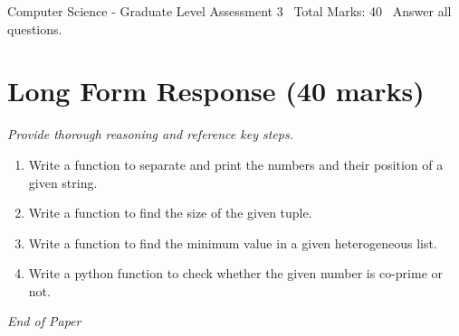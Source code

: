 \documentclass[12pt]{article}
\begin{document}
\begin{center}
Computer Science - Graduate Level Assessment 3 \
Total Marks: 40 \
Answer all questions.
\end{center}

\section*{Long Form Response (40 marks)}
\textit{Provide thorough reasoning and reference key steps.}
\begin{enumerate}[label=\arabic*.]
\item Write a function to separate and print the numbers and their position of a given string.
\item Write a function to find the size of the given tuple.
\item Write a function to find the minimum value in a given heterogeneous list.
\item Write a python function to check whether the given number is co-prime or not.
\end{enumerate}

\vfill
\noindent\textit{End of Paper}
\end{document}
